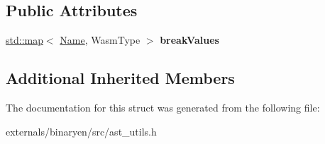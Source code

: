\subsection*{Public Attributes}
\begin{DoxyCompactItemize}
\item 
\mbox{\label{structwasm_1_1_re_finalize_a1625c3f9ea3f85415f65819a2f230269}} 
\mbox{\hyperlink{classstd_1_1map}{std\+::map}}$<$ \mbox{\hyperlink{structwasm_1_1_name}{Name}}, Wasm\+Type $>$ {\bfseries break\+Values}
\end{DoxyCompactItemize}
\subsection*{Additional Inherited Members}


The documentation for this struct was generated from the following file\+:\begin{DoxyCompactItemize}
\item 
externals/binaryen/src/ast\+\_\+utils.\+h\end{DoxyCompactItemize}
